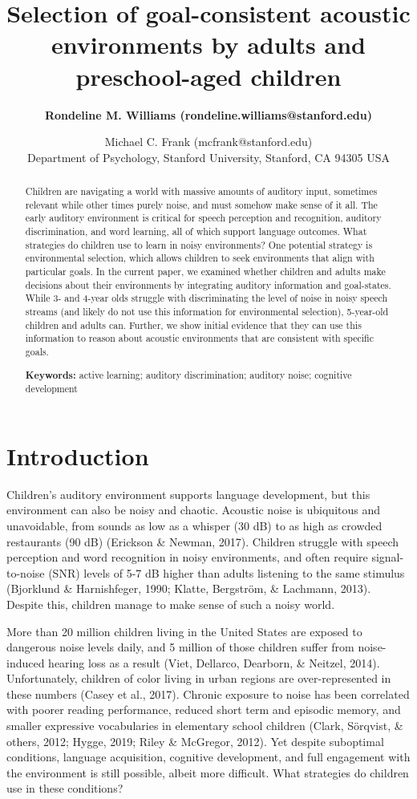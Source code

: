 \documentclass[10pt, letterpaper]{article}
\title{Selection of goal-consistent acoustic environments by adults and
preschool-aged children}
\author{\bf Rondeline M. Williams (rondeline.williams@stanford.edu) \and Michael C. Frank (mcfrank@stanford.edu) \\ Department of Psychology, Stanford University, Stanford, CA 94305 USA}
\begin{document}
\maketitle

\begin{abstract}
Children are navigating a world with massive amounts of auditory input,
sometimes relevant while other times purely noise, and must somehow make
sense of it all. The early auditory environment is critical for speech
perception and recognition, auditory discrimination, and word learning,
all of which support language outcomes. What strategies do children use
to learn in noisy environments? One potential strategy is environmental
selection, which allows children to seek environments that align with
particular goals. In the current paper, we examined whether children and
adults make decisions about their environments by integrating auditory
information and goal-states. While 3- and 4-year olds struggle with
discriminating the level of noise in noisy speech streams (and likely do
not use this information for environmental selection), 5-year-old
children and adults can. Further, we show initial evidence that they can
use this information to reason about acoustic environments that are
consistent with specific goals.

\textbf{Keywords:}
active learning; auditory discrimination; auditory noise; cognitive
development
\end{abstract}

\hypertarget{introduction}{%
\section{Introduction}\label{introduction}}

Children's auditory environment supports language development, but this
environment can also be noisy and chaotic. Acoustic noise is ubiquitous
and unavoidable, from sounds as low as a whisper (30 dB) to as high as
crowded restaurants (90 dB) (Erickson \& Newman, 2017). Children
struggle with speech perception and word recognition in noisy
environments, and often require signal-to-noise (SNR) levels of 5-7 dB
higher than adults listening to the same stimulus (Bjorklund \&
Harnishfeger, 1990; Klatte, Bergström, \& Lachmann, 2013). Despite this,
children manage to make sense of such a noisy world.

More than 20 million children living in the United States are exposed to
dangerous noise levels daily, and 5 million of those children suffer
from noise-induced hearing loss as a result (Viet, Dellarco, Dearborn,
\& Neitzel, 2014). Unfortunately, children of color living in urban
regions are over-represented in these numbers (Casey et al., 2017).
Chronic exposure to noise has been correlated with poorer reading
performance, reduced short term and episodic memory, and smaller
expressive vocabularies in elementary school children (Clark, Sörqvist,
\& others, 2012; Hygge, 2019; Riley \& McGregor, 2012). Yet despite
suboptimal conditions, language acquisition, cognitive development, and
full engagement with the environment is still possible, albeit more
difficult. What strategies do children use in these conditions?
\end{document}
